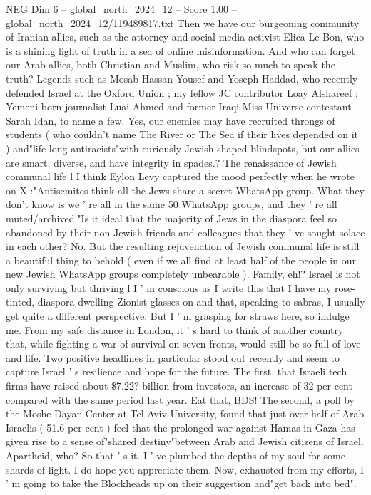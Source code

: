 \begin{textsample}{NEG Dim 6 – global\_north\_2024\_12 – Score 1.00 – global\_north\_2024\_12/119489817.txt}
Then we have our burgeoning community of Iranian allies, such as the attorney and social media activist Elica Le Bon, who is a shining light of truth in a sea of online misinformation.
And who can forget our Arab allies, both Christian and Muslim, who risk so much to speak the truth?
Legends such as Mosab Hassan Yousef and Yoseph Haddad, who recently defended Israel at the Oxford Union ; my fellow JC contributor Loay Alshareef ; Yemeni-born journalist Luai Ahmed and former Iraqi Miss Universe contestant Sarah Idan, to name a few.
Yes, our enemies may have recruited throngs of students ( who couldn't name The River or The Sea if their lives depended on it ) and"life-long antiracists"with curiously Jewish-shaped blindspots, but our allies are smart, diverse, and have integrity in spades.?
The renaissance of Jewish communal life l I think Eylon Levy captured the mood perfectly when he wrote on X :"Antisemites think all the Jews share a secret WhatsApp group.
What they don't know is we ' re all in the same 50 WhatsApp groups, and they ' re all muted/archived."Is it ideal that the majority of Jews in the diaspora feel so abandoned by their non-Jewish friends and colleagues that they ' ve sought solace in each other?
No.
But the resulting rejuvenation of Jewish communal life is still a beautiful thing to behold ( even if we all find at least half of the people in our new Jewish WhatsApp groups completely unbearable ).
Family, eh!?
Israel is not only surviving but thriving l I ' m conscious as I write this that I have my rose-tinted, diaspora-dwelling Zionist glasses on and that, speaking to sabras, I usually get quite a different perspective.
But I ' m grasping for straws here, so indulge me.
From my safe distance in London, it ' s hard to think of another country that, while fighting a war of survival on seven fronts, would still be so full of love and life.
Two positive headlines in particular stood out recently and seem to capture Israel ' s resilience and hope for the future.
The first, that Israeli tech firms have raised about \$7.22? billion from investors, an increase of 32 per cent compared with the same period last year.
Eat that, BDS!
The second, a poll by the Moshe Dayan Center at Tel Aviv University, found that just over half of Arab Israelis ( 51.6 per cent ) feel that the prolonged war against Hamas in Gaza has given rise to a sense of"shared destiny"between Arab and Jewish citizens of Israel.
Apartheid, who?
So that ' s it.
I ' ve plumbed the depths of my soul for some shards of light.
I do hope you appreciate them.
Now, exhausted from my efforts, I ' m going to take the Blockheads up on their suggestion and"get back into bed".

\end{textsample}
